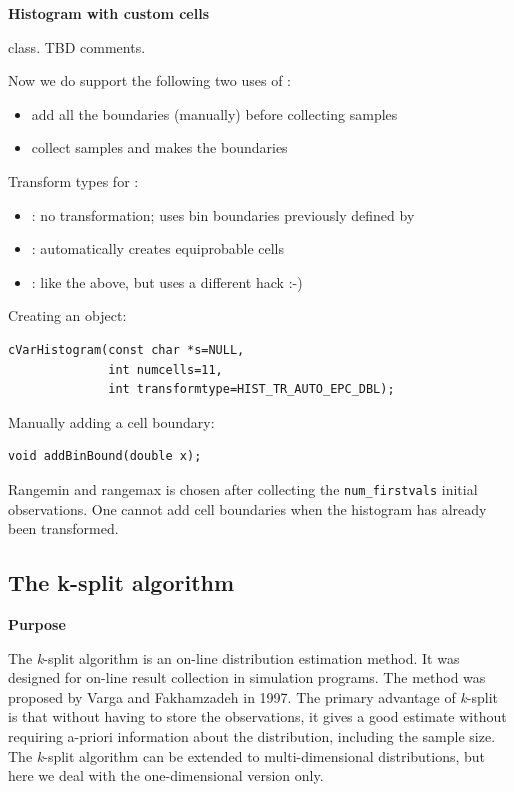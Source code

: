 \textbf{Histogram with custom cells}


 class. TBD comments.


Now we do support the following two uses of :
\begin{itemize}
  \item{add all the boundaries (manually) before collecting samples}
  \item{collect samples and  makes the boundaries}
\end{itemize}

Transform types for :
\begin{itemize}
  \item{: no transformation; uses bin boundaries 
    previously defined by }
  \item{: automatically creates equiprobable cells}
  \item{: like the above, but uses a different 
    hack :-)}
\end{itemize}


Creating an object:

\begin{Verbatim}
cVarHistogram(const char *s=NULL,
              int numcells=11,
              int transformtype=HIST_TR_AUTO_EPC_DBL);
\end{Verbatim}


Manually adding a cell boundary:

\begin{Verbatim}
void addBinBound(double x);
\end{Verbatim}

Rangemin and rangemax is chosen after collecting the
\texttt{num\_firstvals} initial observations. One cannot add cell
boundaries when the histogram has already been transformed.





\subsection{The k-split algorithm}

\textbf{Purpose}


The \textit{k}-split algorithm is an on-line distribution
estimation method.  It was
designed for on-line result collection in simulation programs.  The
method was proposed by Varga and Fakhamzadeh in 1997. The primary
advantage of \textit{k}-split is that without having to store the
observations, it gives a good estimate without requiring a-priori
information about the distribution, including the sample size. The
\textit{k}-split algorithm can be extended to multi-dimensional
distributions, but here we deal
with the one-dimensional version only.


